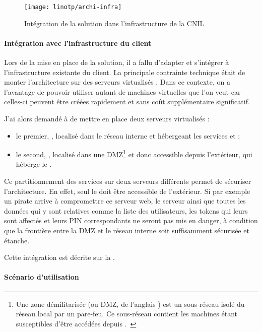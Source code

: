 \begin{figure}
	\centering
	\texttt{[image: linotp/archi-infra]}
	\caption{Intégration de la solution \alinotp{} dans l'infrastructure de la CNIL}
	\label{figure:linotp:archi-infra}
\end{figure}

\paragraph{Intégration avec l'infrastructure du client}
Lors de la mise en place de la solution, il a fallu d'adapter et s'intégrer à l'infrastructure existante du client.
La principale contrainte technique était de monter l'architecture sur des serveurs virtualisés \alinux{} \aredhat{}.
Dans ce contexte, on a l'avantage de pouvoir utiliser autant de machines virtuelles que l'on veut car celles-ci peuvent être créées rapidement et sans coût supplémentaire significatif.

J'ai alors demandé à \amimiette{} de mettre en place deux serveurs virtualisés \aredhat{} :
\begin{itemize}
	\item le premier, \asrvotp{}, localisé dans le réseau interne et hébergeant les services \alinotp{} et \afreerad{} ;
	\item le second, \asrvrp, localisé dans une DMZ\footnote{Une zone démilitarisée (ou DMZ, de l'anglais ) est un sous-réseau isolé du réseau local par un pare-feu. Ce sous-réseau contient les machines étant susceptibles d'être accédées depuis \ainternet.~\cite{dmz}} et donc accessible depuis l'extérieur, qui héberge le \arp{}.
\end{itemize}

Ce partitionnement des services sur deux serveurs différents permet de sécuriser l'architecture.
En effet, seul le \arp{} doit être accessible de l'extérieur.
Si par exemple un pirate arrive à compromettre ce serveur web, le serveur \alinotp{} ainsi que toutes les données qui y sont relatives comme la liste des utilisateurs, les tokens qui leurs sont affectés et leurs PIN correspondants ne seront pas mis en danger, à condition que la frontière entre la DMZ et le réseau interne soit suffisamment sécurisée et étanche.

Cette intégration est décrite sur la .

\paragraph{Scénario d'utilisation}

